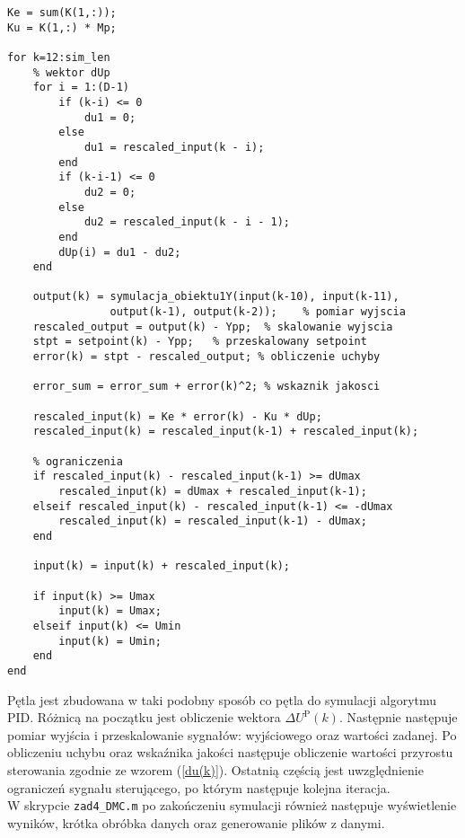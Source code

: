 \begin{lstlisting}[style=custommatlab,frame=single,label={zad4_dmc_sim_lst},caption={Pętla symulująca działanie regulatora DMC},captionpos=b]
Ke = sum(K(1,:));
Ku = K(1,:) * Mp;

for k=12:sim_len    
    % wektor dUp
    for i = 1:(D-1)
        if (k-i) <= 0
            du1 = 0;
        else
            du1 = rescaled_input(k - i);
        end
        if (k-i-1) <= 0
            du2 = 0;
        else
            du2 = rescaled_input(k - i - 1);
        end 
        dUp(i) = du1 - du2;
    end
    
    output(k) = symulacja_obiektu1Y(input(k-10), input(k-11),
    			output(k-1), output(k-2));    % pomiar wyjscia
    rescaled_output = output(k) - Ypp;  % skalowanie wyjscia   
    stpt = setpoint(k) - Ypp;   % przeskalowany setpoint
    error(k) = stpt - rescaled_output; % obliczenie uchyby   
    
    error_sum = error_sum + error(k)^2; % wskaznik jakosci
    
    rescaled_input(k) = Ke * error(k) - Ku * dUp;
    rescaled_input(k) = rescaled_input(k-1) + rescaled_input(k);
    
    % ograniczenia  
    if rescaled_input(k) - rescaled_input(k-1) >= dUmax
        rescaled_input(k) = dUmax + rescaled_input(k-1);
    elseif rescaled_input(k) - rescaled_input(k-1) <= -dUmax
        rescaled_input(k) = rescaled_input(k-1) - dUmax;
    end   
    
    input(k) = input(k) + rescaled_input(k);  
    
    if input(k) >= Umax
        input(k) = Umax;
    elseif input(k) <= Umin
        input(k) = Umin;
    end 
end
\end{lstlisting}

Pętla jest zbudowana w taki podobny sposób co pętla do symulacji algorytmu PID. Różnicą na początku jest obliczenie wektora $\Delta U^{\mathrm{P}}(k)$. Następnie następuje pomiar wyjścia i przeskalowanie sygnałów: wyjściowego oraz wartości zadanej. Po obliczeniu uchybu oraz wskaźnika jakości następuje obliczenie wartości przyrostu sterowania zgodnie ze wzorem (\ref{du(k)}). Ostatnią częścią jest uwzględnienie ograniczeń sygnału sterującego, po którym następuje kolejna iteracja.\\
\indent{} W skrypcie \verb+zad4_DMC.m+ po zakończeniu symulacji również następuje wyświetlenie wyników, krótka obróbka danych oraz generowanie plików z danymi.

